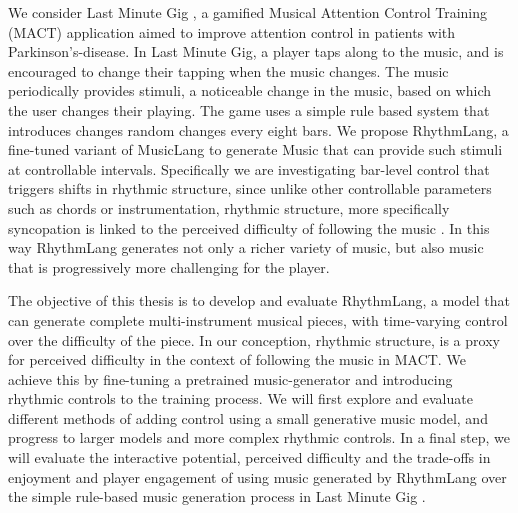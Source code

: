 We consider Last Minute Gig \cite{Chalkiadakis_2022}, a gamified Musical Attention Control Training (MACT) application aimed to improve attention control in patients with Parkinson's-disease. In Last Minute Gig, a player taps along to the music, and is encouraged to change their tapping when the music changes. The music periodically provides stimuli, a noticeable change in the music, based on which the user changes their playing. The game uses a simple rule based system that introduces changes random changes every eight bars. We propose RhythmLang, a fine-tuned variant of MusicLang to generate Music that can provide such stimuli at controllable intervals. Specifically we are investigating bar-level control that triggers shifts in rhythmic structure, since unlike other controllable parameters such as chords or instrumentation, rhythmic structure, more specifically syncopation is linked to the perceived difficulty of following the music \cite{Volk2008Syncopation}. In this way RhythmLang generates not only a richer variety of music, but also music that is progressively more challenging for the player.   

The objective of this thesis is to develop and evaluate RhythmLang, a model that can generate complete multi-instrument musical pieces, with time-varying control over the difficulty of the piece. In our conception, rhythmic structure, is a proxy for perceived difficulty in the context of following the music in MACT. We achieve this by fine-tuning a pretrained music-generator and  introducing rhythmic controls to the training process. We will first explore and evaluate different methods of adding control using a small generative music model, and progress to larger models and more complex rhythmic controls. In a final step, we will evaluate the interactive potential, perceived difficulty and the trade-offs in enjoyment and player engagement of using music generated by RhythmLang over the simple rule-based music generation process in Last Minute Gig \cite{Chalkiadakis_2022}.

